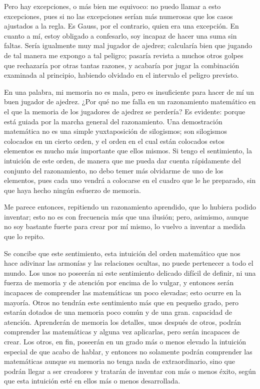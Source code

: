 \documentclass[a4paper, 12pt, draft]{article}
\begin{document}
Pero hay excepciones, o más bien me equivoco: no puedo llamar a esto
excepciones, pues si no las excepciones serían más numerosas que
los casos ajustados a la regla. Es Gauss, por el contrario, quien era una
excepción. En cuanto a mí, estoy obligado a confesarlo, soy incapaz
de hacer una suma sin faltas. Sería igualmente muy mal jugador de
ajedrez; calcularía bien que jugando de tal manera me expongo a tal
peligro; pasaría revista a muchos otros golpes que rechazaría por
otras tantas razones, y acabaría por jugar la combinación examinada
al principio, habiendo olvidado en el intervalo el peligro previsto.

En una palabra, mi memoria no es mala, pero es insuficiente para hacer de mí un buen jugador de ajedrez. ¿Por qué no me falla en un
razonamiento matemático en el que la memoria de los jugadores de ajedrez
se perdería? Es evidente: porque está guiada por la marcha general
del razonamiento. Una demostración matemática no es una simple
yuxtaposición de silogismos; son silogismos colocados en un cierto
orden, y el orden en el cual están colocados estos elementos es mucho más importante que ellos mismos. Si tengo el sentimiento, la intuición de este orden, de manera que me pueda dar cuenta rápidamente del
conjunto del razonamiento, no debo temer más olvidarme de uno de los
elementos, pues cada uno vendrá a colocarse en el cuadro que le he
preparado, sin que haya hecho ningún esfuerzo de memoria.

Me parece entonces, repitiendo un razonamiento aprendido, que lo
hubiera podido inventar; esto no es con frecuencia más que una ilusión; pero, asimismo, aunque no soy bastante fuerte para crear por mí
mismo, lo vuelvo a inventar a medida que lo repito.

Se concibe que este sentimiento, esta intuición del orden matemático
que nos hace adivinar las armonías y las relaciones ocultas, no puede
pertenecer a todo el mundo. Los unos no poseerán ni este
sentimiento delicado difícil de definir, ni una fuerza de memoria y de
atención por encima de lo vulgar, y entonces serán incapaces de
comprender las matemáticas un poco elevadas; esto ocurre en la mayoría. Otros no tendrán este sentimiento más que en pequeño
grado, pero estarán dotados de una memoria poco común y de una gran.
capacidad de atención. Aprenderán de memoria los detalles, unos después de otros, podrán comprender las matemáticas y alguna vez
aplicarlas, pero serán incapaces de crear. Los otros, en fin, poseerán en un grado más o menos elevado la intuición especial de que acabo
de hablar, y entonces no solamente podrán comprender las matemáticas
aunque su memoria no tenga nada de extraordinario, sino que podrán
llegar a ser creadores y tratarán de inventar con más o menos éxito, según que esta intuición esté en ellos más o menos
desarrollada.
\end{document}
